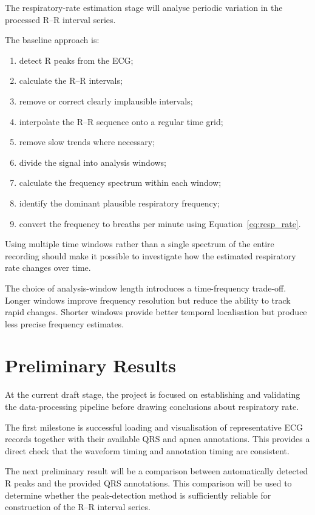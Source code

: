 The respiratory-rate estimation stage will analyse periodic variation in the
processed R--R interval series.

The baseline approach is:

\begin{enumerate}
    \item detect R peaks from the ECG;
    \item calculate the R--R intervals;
    \item remove or correct clearly implausible intervals;
    \item interpolate the R--R sequence onto a regular time grid;
    \item remove slow trends where necessary;
    \item divide the signal into analysis windows;
    \item calculate the frequency spectrum within each window;
    \item identify the dominant plausible respiratory frequency;
    \item convert the frequency to breaths per minute using
    Equation~\ref{eq:resp_rate}.
\end{enumerate}

Using multiple time windows rather than a single spectrum of the entire
recording should make it possible to investigate how the estimated
respiratory rate changes over time.

The choice of analysis-window length introduces a time-frequency trade-off.
Longer windows improve frequency resolution but reduce the ability to track
rapid changes. Shorter windows provide better temporal localisation but
produce less precise frequency estimates.


\section{Preliminary Results}
\label{sec:results}

At the current draft stage, the project is focused on establishing and
validating the data-processing pipeline before drawing conclusions about
respiratory rate.

The first milestone is successful loading and visualisation of representative
ECG records together with their available QRS and apnea annotations. This
provides a direct check that the waveform timing and annotation timing are
consistent.

The next preliminary result will be a comparison between automatically
detected R peaks and the provided QRS annotations. This comparison will be
used to determine whether the peak-detection method is sufficiently reliable
for construction of the R--R interval series.


